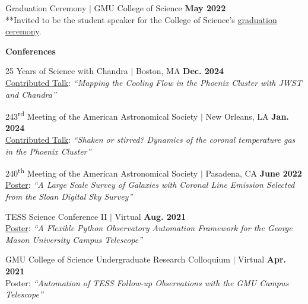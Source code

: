 \documentclass[marg, centered]{res}
\begin{document}
\begin{resume}
\begin{talks}[itemindent=0pt, leftmargin=19pt]
\item Graduation Ceremony $|$ GMU College of Science \hfill \textbf{May 2022} \\
**Invited to be the student speaker for the College of Science's \href{https://www.youtube.com/watch?v=xsyi9sqYH4o}{\color{dkbu} graduation ceremony}.

\end{talks}

\textbf{Conferences}

\begin{talks}[itemindent=0pt, leftmargin=19pt]

\item 25 Years of Science with Chandra $|$ Boston, MA \hfill \textbf{Dec. 2024} \\
\href{https://cxc.cfa.harvard.edu/cdo/symposium_2024/schedule.html\#talk}{\color{dkbu} Contributed Talk}: \textit{``Mapping the Cooling Flow in the Phoenix Cluster with JWST and Chandra''}

\item 243\textsuperscript{rd} Meeting of the American Astronomical Society $|$ New Orleans, LA \hfill \textbf{Jan. 2024} \\
\href{https://ui.adsabs.harvard.edu/abs/2024AAS...24344204R/abstract}{\color{dkbu} Contributed Talk}: \textit{``Shaken or stirred? Dynamics of the coronal temperature gas in the Phoenix Cluster''}
    
\item 240\textsuperscript{th} Meeting of the American Astronomical Society $|$ Pasadena, CA \hfill \textbf{June 2022} \\
\href{https://ui.adsabs.harvard.edu/abs/2022AAS...24010113R/abstract}{\color{dkbu} Poster}: \textit{``A Large Scale Survey of Galaxies with Coronal Line Emission Selected from the Sloan Digital Sky Survey''}

\item TESS Science Conference II $|$ Virtual \hfill \textbf{Aug. 2021}\\
\href{https://zenodo.org/records/5114171}{\color{dkbu} Poster}: \textit{``A Flexible Python Observatory Automation Framework for the George Mason University Campus Telescope''}

\item GMU College of Science Undergraduate Research Colloquium $|$ Virtual \hfill \textbf{Apr. 2021}\\
Poster: \textit{``Automation of TESS Follow-up Observations with the GMU Campus Telescope''}


\end{talks}
\end{resume}
\end{document}
